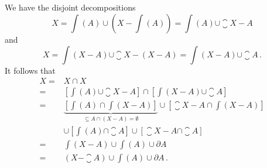 \subsection{}

We have the disjoint decompositions
\[
	X
	=
	\int(A) ∪ (X - \int(A))
	=
	\int(A) ∪ \closure{X - A}
\]
and
\[
	X
	=
	\int(X - A) ∪ \closure{X - (X - A)}
	=
	\int(X - A) ∪ \closure{A} \,.
\]
It follows that
\begin{align*}
	X
	={}&
	X ∩ X
	\\
	={}&
	[ \int(A) ∪ \closure{X - A} ] ∩ [ \int(X - A) ∪ \closure{A} ]
	\\
	={}&
	\underbrace{[ \int(A) ∩ \int(X - A) ]}_{⊆ A ∩ (X - A) = ∅}
	∪ [ \closure{X - A} ∩ \int(X - A) ]
	\\
	{}&
	∪ [ \int(A) ∩ \closure{A} ]
	∪ [ \closure{X - A} ∩ \closure{A} ]
	\\
	={}&
	\int(X - A) ∪ \int(A) ∪ ∂A
	\\
	={}&
	(X - \closure{A}) ∪ \int(A) ∪ ∂A \,.
\end{align*}
